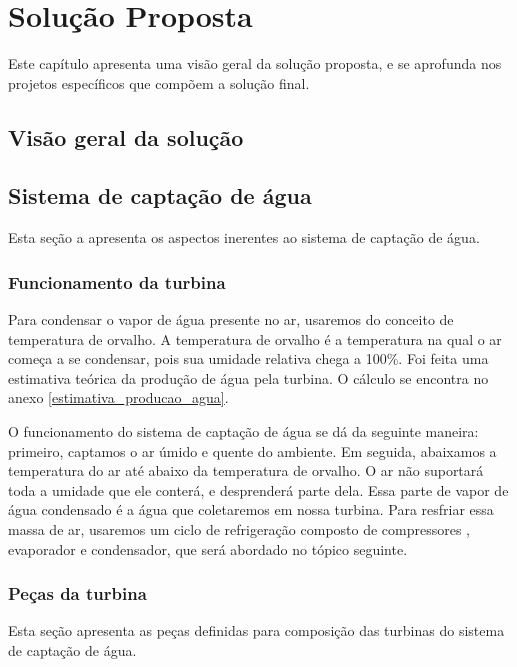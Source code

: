 \chapter{Solução Proposta}

  Este capítulo apresenta uma visão geral da solução proposta, e se aprofunda nos projetos específicos que 
  compõem a solução final.
  
  \section{Visão geral da solução}
    
    

  \section{Sistema de captação de água}
  
    Esta seção a apresenta os aspectos inerentes ao sistema de captação de água.
    
    \subsection{Funcionamento da turbina}
    
      Para condensar o vapor de água presente no ar, usaremos do conceito de temperatura de orvalho. A temperatura de orvalho 
      é a temperatura na qual o ar começa a se condensar, pois sua umidade relativa chega a 100\%. Foi feita uma estimativa
      teórica da produção de água pela turbina. O cálculo se encontra no anexo \ref{estimativa_producao_agua}.
      
      O funcionamento do sistema de captação de água se dá da seguinte maneira: primeiro, captamos o ar úmido e quente do ambiente.
      Em seguida, abaixamos a temperatura do ar até abaixo da temperatura de orvalho. O ar não suportará toda a umidade que ele
      conterá, e desprenderá parte dela. Essa parte de vapor de água condensado é a água que coletaremos em nossa turbina. 
      Para resfriar essa massa de ar, usaremos um ciclo de refrigeração composto de compressores , evaporador e condensador,
      que será abordado no tópico seguinte.
    
    \subsection{Peças da turbina}
      
      Esta seção apresenta as peças definidas para composição das turbinas do sistema de captação de água.
      
